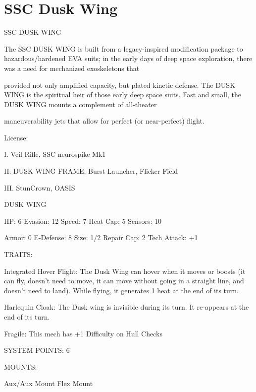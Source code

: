 \section{SSC Dusk Wing}

                                           SSC DUSK WING

The SSC DUSK WING is built from a legacy-inspired modification package to hazardous/hardened EVA
suits; in the early days of deep space exploration, there was a need for mechanized exoskeletons that

provided not only amplified capacity, but plated kinetic defense. The DUSK WING is the spiritual heir of
those early deep space suits. Fast and small, the DUSK WING mounts a complement of all-theater

maneuverability jets that allow for perfect (or near-perfect) flight.

                                                    License:

I. Veil Rifle, SSC neurospike Mk1

II. DUSK WING FRAME, Burst Launcher, Flicker Field

III. StunCrown, OASIS


                                                 DUSK WING

  HP: 6           Evasion: 12                           Speed: 7            Heat Cap: 5        Sensors: 10

  Armor: 0        E-Defense: 8                          Size: 1/2           Repair Cap: 2      Tech Attack:
                                                                                               +1

                                                     TRAITS:

  Integrated Hover Flight: The Dusk Wing can hover when it moves or boosts (it can fly, doesn’t need to
  move, it can move without going in a straight line, and doesn’t need to land). While flying, it generates 1
  heat at the end of its turn.

  Harlequin Cloak: The Dusk wing is invisible during its turn. It re-appears at the end of its turn.

  Fragile: This mech has +1 Difficulty on Hull Checks

                                              SYSTEM POINTS: 6

                                                    MOUNTS:

  Aux/Aux Mount                      Flex Mount

